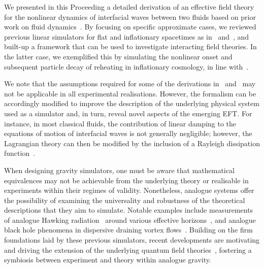 \documentclass[a4paper]{jpconf}
\begin{document}
We presented in this Proceeding a detailed derivation of an effective field theory for the nonlinear dynamics of interfacial waves between two fluids based on prior work on fluid dynamics~\cite{Miles1976NonlinearBasins,Miles1984NonlinearResonance}. By focusing on specific approximate cases, we reviewed previous linear simulators for flat and inflationary spacetimes as in~\cite{bunney2023third} and~\cite{Fifer2019AnalogField}, and built-up a framework that can be used to investigate interacting field theories. In the latter case, we exemplified this by simulating the nonlinear onset and subsequent particle decay of reheating in inflationary cosmology, in line with~\cite{barroso2022primary}.

We note that the assumptions required for some of the derivations in~ and~ may not be applicable in all experimental realisations. However, the formalism can be accordingly modified to improve the description of the underlying physical system used as a simulator and, in turn, reveal novel aspects of the emerging EFT. For instance, in most classical fluids, the contribution of linear damping to the equations of motion of interfacial waves is not generally negligible; however, the Lagrangian theory can then be modified by the inclusion of a Rayleigh dissipation function~\cite{barroso2022primary,Miles1984NonlinearResonance}.

When designing gravity simulators, one must be aware that mathematical equivalences may not be achievable from the underlying theory or realisable in experiments within their regimes of validity. Nonetheless, analogue systems offer the possibility of examining the universality and robustness of the theoretical descriptions that they aim to simulate. Notable examples include measurements of analogue Hawking radiation~\cite{Hawking1975ParticleHoles} around various effective horizons~\cite{Belgiorno2010HawkingFilaments,Philbin2008Fiber-opticalHorizon,Weinfurtner2011MeasurementSystem,Steinhauer2016ObservationHole}, and analogue black hole phenomena in dispersive draining vortex flows~\cite{Torres2017RotationalFlow,Torres20QNM}. Building on the firm foundations laid by these previous simulators, recent developments are motivating and driving the extension of the underlying quantum field theories~\cite{Fifer2019AnalogField,barroso2022primary,BunneyCircular,bunney2023third}, fostering a symbiosis between experiment and theory within analogue gravity.

 
\end{document}
